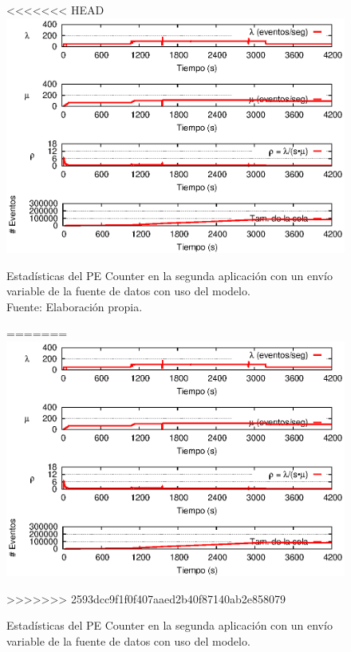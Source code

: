 \begin{figure}[!ht]
<<<<<<< HEAD
    \centering
    \captionsetup{justification=centering}
    \includegraphics[scale=1]{images/exp/app2/normal/cm/statusCounterPE.eps}
    \caption[Estadísticas del PE Counter en la segunda aplicación con un envío variable de la fuente de datos con uso del modelo.]{Estadísticas del PE Counter en la segunda aplicación con un envío variable de la fuente de datos con uso del modelo.\\Fuente: Elaboración propia.}
=======
\centering
    \includegraphics[scale=1.1]{images/exp/app2/normal/cm/statusCounterPE.eps}
    \caption{Estad\'isticas del PE Counter en la segunda aplicaci\'on con un env\'io variable de la fuente de datos con uso del modelo.}
>>>>>>> 2593dcc9f1f0f407aaed2b40f87140ab2e858079
    \label{fig:app2-normal-statusCounterPE-cm}
\end{figure}

